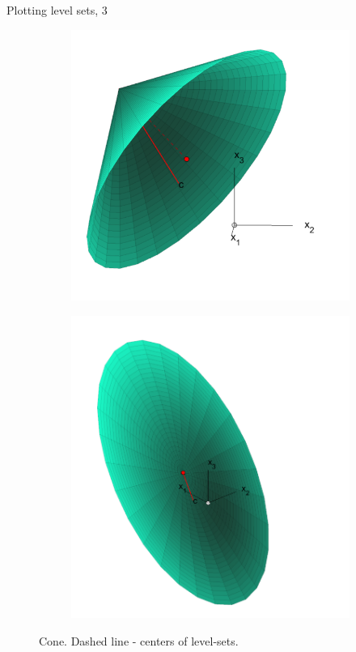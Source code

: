 \documentclass{beamer}
\begin{document}
\begin{frame}{Plotting level sets, 3}
	\begin{flushleft}
		
		
		\begin{figure}
			\centering
			\begin{subfigure}[b]{0.45\textwidth}
				\centering
				\includegraphics[width=\textwidth]{plotted1}
			\end{subfigure}
			\hfill
			\begin{subfigure}[b]{0.45\textwidth}
				\centering
				\includegraphics[width=\textwidth]{plotted2}
			\end{subfigure}
			\caption{Cone. Dashed line - centers of level-sets.}
		\end{figure}
		

\end{flushleft}
\end{frame}
\end{document}
